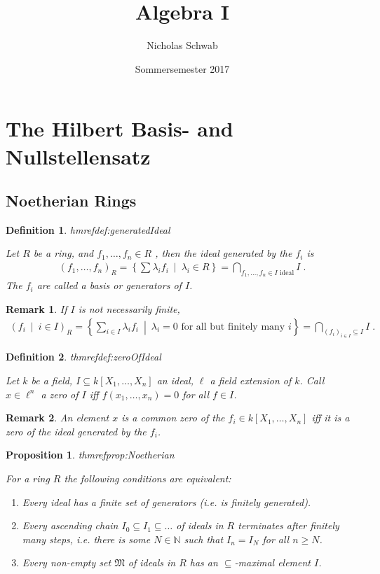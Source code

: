 \documentclass[DIV=14,parskip=full,pointednumbers]{scrartcl}
\title{Algebra I}
\author{Nicholas Schwab}
\date{Sommersemester 2017}
\newenvironment{rmnumerate}{\begin{enumerate}[label={\upshape(\roman*)}]}{\end{enumerate}}
\theoremstyle{cthm}
\newtheorem{prop}{Proposition}[subsection]
\theoremstyle{cdef}
\newtheorem{defi}{Definition}[subsection]
\newtheorem{rem}{Remark}[subsection]
\newcommand{\lbl}[1]{
	\label{#1}
	\edef\dummy{\curthm}
	\expandafter\xdef\csname thmref#1\endcsname{\dummy}
}
\newcommand{\IN}{\mathbb{N}}
\newcommand{\st}{\ \middle|\ }
\begin{document}
\maketitle
\section{The Hilbert Basis- and Nullstellensatz}
\subsection{Noetherian Rings}
\begin{defi}\lbl{def:generatedIdeal}
 Let $R$ be a ring, and $f_1,\ldots, f_n\in R$ , then  the \emph{ideal generated by the $f_i$} is
 \begin{align*}\left( f_1,\ldots,  f_n\right)_R = \left\{\sum\lambda_i f_i\st\lambda_i \in R\right\} = \bigcap_{f_1,\ldots,f_n\in I\text{ ideal}} I\;.
 \end{align*}
The $f_i$ are called a \emph{basis} or \emph{generators} of $I$. 
\end{defi}
\begin{rem}
 If $I$ is not necessarily finite, 
 \begin{align*}
\left( f_i\st i\in I\right)_R = \left\{\sum_{i\in I} \lambda_i f_i \st\lambda_i = 0 \text{ for all but finitely many } i\right\} = \bigcap_{(f_i)_{i\in I}\subseteq I} I\;.
\end{align*}
\end{rem}
\begin{defi}\lbl{def:zeroOfIdeal}
 Let $k$ be a field, $I\subseteq k[X_1,\ldots, X_n]$ an ideal, $\ell$ a field extension of $k$. Call $x\in \ell^n$ a \emph{zero} of $I$ iff $f(x_1,\ldots,x_n) = 0$ for all $f\in I$. 
\end{defi}
\begin{rem}
 An element $x$ is a common zero of the $f_i\in k[X_1,\ldots,X_n]$ iff it is a zero of the ideal generated by the $f_i$.
\end{rem}
\begin{prop}\lbl{prop:Noetherian}
 For a ring $R$ the following conditions are equivalent:
 \begin{rmnumerate}
  \item Every ideal has a finite set of generators (i.e. is finitely generated).
  \item Every ascending chain $I_0 \subseteq I_1 \subseteq \ldots$ of ideals in $R$ terminates after finitely many steps, i.e. there is some $N\in\IN$ such that $I_n=I_N$ for all $n\geq N$.
  \item Every non-empty set $\mathfrak{M}$ of ideals in $R$ has an $\subseteq$-maximal element $I$. 
 \end{rmnumerate}
\end{prop}
\end{document}
